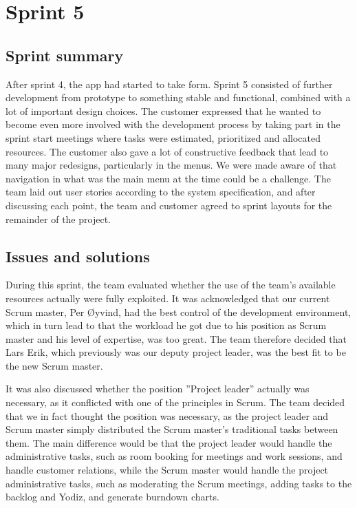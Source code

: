 \section{Sprint 5}
\subsection{Sprint summary}
After sprint 4, the app had started to take form. Sprint 5 consisted of further development from prototype to something stable and functional, combined with a lot of important design choices. The customer expressed that he wanted to become even more involved with the development process by taking part in the sprint start meetings where tasks were estimated, prioritized and allocated resources. The customer also gave a lot of constructive feedback that lead to many major redesigns, particularly in the menus. We were made aware of that navigation in what was the main menu at the time could be a challenge. The team laid out user stories according to the system specification, and after discussing each point, the team and customer agreed to sprint layouts for the remainder of the project.




\subsection{Issues and solutions}
\label{sec:unbalancedWorkload}
During this sprint, the team evaluated whether the use of the team's available resources actually were fully exploited. It was acknowledged that our current Scrum master, Per Øyvind, had the best control of the development environment, which in turn lead to that the workload he got due to his position as Scrum master and his level of expertise, was too great. The team therefore decided that Lars Erik, which previously was our deputy project leader, was the best fit to be the new Scrum master.

It was also discussed whether the position ''Project leader'' actually was necessary, as it conflicted with one of the principles in Scrum. The team decided that we in fact thought the position was necessary, as the project leader and Scrum master simply distributed the Scrum master's traditional tasks between them. The main difference would be that the project leader would handle the administrative tasks, such as room booking for meetings and work sessions, and handle customer relations, while the Scrum master would handle the project administrative tasks, such as moderating the Scrum meetings, adding tasks to the backlog and Yodiz, and generate burndown charts.

